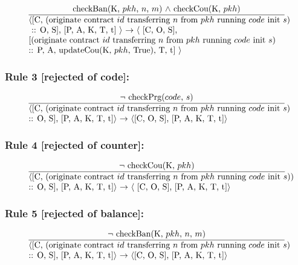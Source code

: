 \documentclass[a4paper]{llncs}
\begin{document}
\begin{equation}{}
\frac{\text{checkBan(K, $pkh$, $n$, $m$) $\wedge$ checkCou(K, $pkh$)}}{\parbox{4.2in}{\text{$\langle$[C, (originate contract ${id}$ transferring  ${n}$ from ${pkh}$ running ${code}$ init ${s}$)} \text{ :: O, S], [P, A, K, T, t] $\rangle$ $\rightarrow$ $\langle$ [C, O, S],} \text{[(originate contract ${id}$ transferring ${n}$ from ${pkh}$ running ${code}$ init ${s}$)} \text{:: P, A, updateCou(K, $pkh$, True), T, t] $\rangle$}}} 
\end{equation}

\subsubsection*{Rule 3 [rejected of code]:}

\begin{equation}{}
\frac{\text{$\neg$ checkPrg($code$, $s$)}}{\parbox{4.2in}{\text{$\langle$[C, (originate contract ${id}$ transferring  ${n}$ from ${pkh}$ running ${code}$ init ${s}$)} \text{:: O, S], [P, A, K, T, t]$\rangle$ $\rightarrow$ $\langle$[C, O, S],} \text{[P, A, K, T, t]$\rangle$}}} 
\end{equation}

\subsubsection*{Rule 4 [rejected of counter]:}

\begin{equation}{}
\frac{\text{$\neg$ checkCou(K, $pkh$)}}{\parbox{4.2in}{\text{$\langle$[C, (originate contract ${id}$ transferring  ${n}$ from ${pkh}$ running ${code}$ init ${s}$))} \text{:: O, S], [P, A, K, T, t]$\rangle$ $\rightarrow$ $\langle$ [C, O, S],} \text{[P, A, K, T, t]$\rangle$}}} 
\end{equation}

\subsubsection*{Rule 5 [rejected of balance]:}

\begin{equation}{}
\frac{\text{$\neg$ checkBan(K, $pkh$, $n$, $m$)}}{\parbox{4.2in}{\text{$\langle$[C, (originate contract ${id}$ transferring  ${n}$ from ${pkh}$ running ${code}$ init ${s}$)} \text{:: O, S], [P, A, K, T, t]$\rangle$ $\rightarrow$ $\langle$[C, O, S],} \text{[P, A, K, T, t]$\rangle$}}} 
\end{equation}
\end{document}
